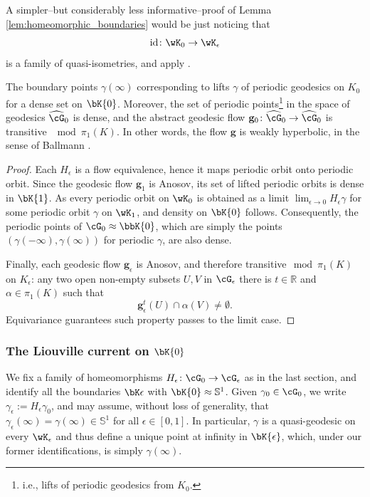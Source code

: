 \documentclass[reqno,11pt]{amsart}
\begin{document}
    \begin{remark}
        A simpler--but considerably less informative--proof of Lemma \ref{lem:homeomorphic_boundaries} would be just noticing that \[\mathrm{id}\colon \wK_0 \to \wK_\epsilon
        \]
        is a family of quasi-isometries, and apply \cite[Theorem III.H.3.9]{bridson2011metric}.
    \end{remark}
    \begin{corollary}\label{cor:dense_periodic_liftings}
        The boundary points \(\gamma(\infty)\) corresponding to lifts \(\gamma\) of periodic geodesics on \(K_0\) for a dense set on \(\bK{0}\).
        Moreover, the set of periodic points\footnote{
            i.e., lifts of periodic geodesics from \(K_0\).
        } 
        in the space of geodesics \(\widehat{\cG}_0\) is dense, and the abstract geodesic flow \(\mathbf{g}_0\colon \widehat{\cG}_0 \to \widehat{\cG}_0\) is transitive \(\mod{\pi_1(K)}\).
        In other words, the flow \(\mathbf{g}\) is weakly hyperbolic, in the sense of Ballmann \cite{ballmann1995lectures}.
    \end{corollary}
    \begin{proof}
        Each \(H_\epsilon\) is a flow equivalence, hence it maps periodic orbit onto periodic orbit.
        Since the geodesic flow \(\mathbf{g}_1\) is Anosov, its set of lifted periodic orbits is dense in \(\bK{1}\).
        As every periodic orbit on \(\wK_0\) is obtained as a limit \(\lim_{\epsilon \to 0}H_\epsilon\gamma\) for some periodic orbit \(\gamma\) on \(\wK_1\), and density on \(\bK{0}\) follows.
        Consequently, the periodic points of \(\cG_0 \approx \bbK{0}\), which are simply the points \((\gamma(-\infty), \gamma(\infty))\) for periodic \(\gamma\), are also dense.
        \par Finally, each geodesic flow \(\mathbf{g}_\epsilon\) is Anosov, and therefore transitive\(\!\mod{\pi_1(K)}\) on \(K_\epsilon\): any two open non-empty subsets \(U, V\) in \(\cG_\epsilon\) there is \(t \in \mathbb{R}\) and \(\alpha \in \pi_1(K)\) such that 
        \[
            \mathbf{g}_\epsilon^t(U) \cap \alpha(V) \neq \emptyset.
        \]
        Equivariance guarantees such property passes to the limit case.    
        \end{proof}

    
    \subsubsection{The Liouville current on \(\bK{0}\)}
    We fix a family of homeomorphisms \(H_\epsilon\colon \cG_0 \to \cG_\epsilon\) as in the last section, and identify all the boundaries \(\bK\epsilon\) with \(\bK{0} \approx \mathbb{S}^1\).  
    Given \(\gamma_0 \in \cG_0\), we write \(\gamma_\epsilon := H_\epsilon \gamma_0\), and may assume, without loss of generality, that \(\gamma_\epsilon(\infty) = \gamma(\infty) \in \mathbb{S}^1\) for all \(\epsilon \in [0,1]\). 
    In particular, \(\gamma\) is a quasi-geodesic on every \(\wK_\epsilon\) and thus define a unique point at infinity in \(\bK{\epsilon}\), which, under our former identifications, is simply \(\gamma(\infty)\).
    
\end{document}
